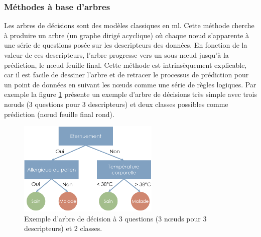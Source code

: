 \subsubsection{Méthodes à base d'arbres}
Les arbres de décisions sont des modèles classiques en \gls{ml}. Cette méthode cherche à produire un arbre (un graphe dirigé acyclique) où chaque nœud s'apparente à une série de questions posée sur les descripteurs des données. En fonction de la valeur de ces descripteurs, l'arbre progresse vers un sous-nœud jusqu'à la prédiction, le nœud feuille final. Cette méthode est intrinsèquement explicable, car il est facile de dessiner l'arbre et de retracer le processus de prédiction pour un point de données en suivant les nœuds comme une série de règles logiques. Par exemple la figure \ref{fig:decision-tree} présente un exemple d'arbre de décisions très simple avec trois nœuds (3 questions pour 3 descripteurs) et deux classes possibles comme prédiction (nœud feuille final rond).
\begin{figure}[!htbp]
 \centering
 \includegraphics[width=0.6\textwidth]{figures/decision_tree.png}
 \caption[Exemple d'arbre de décision]{Exemple d'arbre de décision à 3 questions (3 nœuds pour 3 descripteurs) et 2 classes.}
 \label{fig:decision-tree}
\end{figure}

